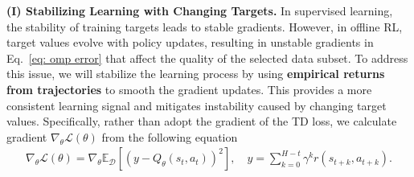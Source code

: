 \textbf{(I) Stabilizing Learning with Changing Targets.} 
In supervised learning, the stability of training targets leads to stable gradients. However, in offline RL, target values evolve with policy updates, resulting in unstable gradients in Eq.~\ref{eq: omp error} that affect the quality of the selected data subset. To address this issue, we will stabilize the learning process by using \textbf{empirical returns from trajectories} to smooth the gradient updates. This provides a more consistent learning signal and mitigates instability caused by changing target values.
Specifically, rather than adopt the gradient of the TD loss, we calculate gradient $\nabla_{\theta}\mathcal L\left(\theta\right)$ from the following equation
\begin{align}
\label{eq: q-target value}
    \nabla_{\theta}\mathcal L\left(\theta\right) = \nabla_{\theta}\mathbb{E}_\mathcal{D}[(y - Q_{\theta}(s_t,a_t))^2], \quad
    y = \sum_{k=0}^{H-t} \gamma^k r(s_{t+k}, a_{t+k}).
\end{align}


